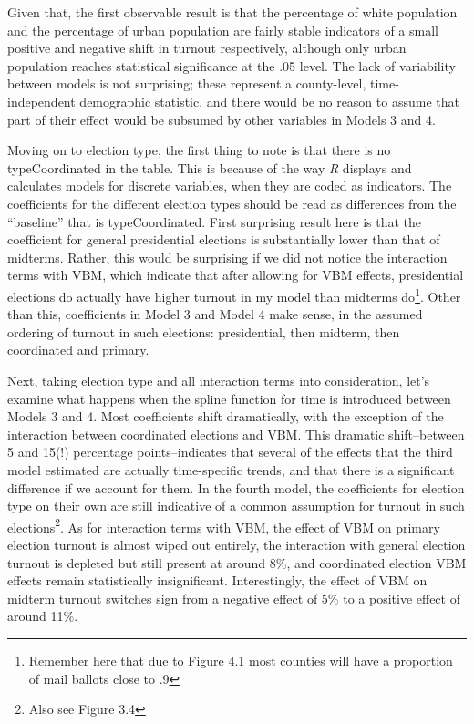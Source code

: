 \documentclass[12pt,twoside]{reedthesis}
\begin{document}
  Given that, the first observable result is that the percentage of white
  population and the percentage of urban population are fairly stable
  indicators of a small positive and negative shift in turnout
  respectively, although only urban population reaches statistical
  significance at the .05 level. The lack of variability between models is
  not surprising; these represent a county-level, time-independent
  demographic statistic, and there would be no reason to assume that part
  of their effect would be subsumed by other variables in Models 3 and 4.
  
  Moving on to election type, the first thing to note is that there is no
  typeCoordinated in the table. This is because of the way \textit{R}
  displays and calculates models for discrete variables, when they are
  coded as indicators. The coefficients for the different election types
  should be read as differences from the ``baseline'' that is
  typeCoordinated. First surprising result here is that the coefficient
  for general presidential elections is substantially lower than that of
  midterms. Rather, this would be surprising if we did not notice the
  interaction terms with VBM, which indicate that after allowing for VBM
  effects, presidential elections do actually have higher turnout in my
  model than midterms do\footnote{Remember here that due to Figure 4.1
    most counties will have a proportion of mail ballots close to .9}.
  Other than this, coefficients in Model 3 and Model 4 make sense, in the
  assumed ordering of turnout in such elections: presidential, then
  midterm, then coordinated and primary.
  
  Next, taking election type and all interaction terms into consideration,
  let's examine what happens when the spline function for time is
  introduced between Models 3 and 4. Most coefficients shift dramatically,
  with the exception of the interaction between coordinated elections and
  VBM. This dramatic shift--between 5 and 15(!) percentage
  points--indicates that several of the effects that the third model
  estimated are actually time-specific trends, and that there is a
  significant difference if we account for them. In the fourth model, the
  coefficients for election type on their own are still indicative of a
  common assumption for turnout in such elections\footnote{Also see Figure
    3.4}. As for interaction terms with VBM, the effect of VBM on primary
  election turnout is almost wiped out entirely, the interaction with
  general election turnout is depleted but still present at around 8\%,
  and coordinated election VBM effects remain statistically insignificant.
  Interestingly, the effect of VBM on midterm turnout switches sign from a
  negative effect of 5\% to a positive effect of around 11\%.
  
\end{document}
